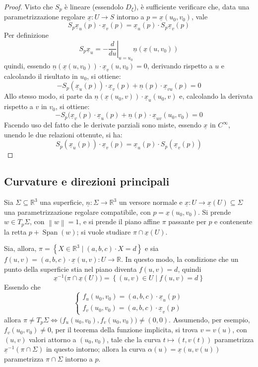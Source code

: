 \documentclass[12pt]{scrartcl}
\theoremstyle{style}
\newcommand*\Eval[3]{\left.#1\right\rvert_{#2}^{#3}}
\numberwithin{equation}{subsection}
\begin{document}
\begin{proof}
	Visto che $S_p$ \`e lineare (essendolo $D_\xi $), \`e sufficiente verificare che, data una parametrizzazione regolare $\underline{x}:U\to S$ intorno a $p=\underline{x}(u_0,v_0)$, vale
	\[
	S_p \underline{x}_u(p) \cdot \underline{x}_v (p) = \underline{x}_u(p) \cdot S_p \underline{x}_v(p)
	\] 
Per definizione
\[
	S_p \underline{x}_u = - \Eval{\frac{d }{d u} }{u = u_0}{}\underline{n}(\underline{x}(u,v_0))
\] 
quindi, essendo $\underline{n}(\underline{x}(u,v_0)) \cdot \underline{x}_v(u,v_0) = 0$, derivando rispetto a $u$ e calcolando il risultato in $u_0$, si ottiene:
\[
-S_p(\underline{x}_u(p)) \cdot \underline{x}_v (p) + \underline{n}(p) \cdot \underline{x}_{vu} (p) = 0
\] 
Allo stesso modo, si parte da $\underline{n}(\underline{x}(u_0,v)) \cdot \underline{x}_u(u_0,v)$ e, calcolando la derivata rispetto a $v$ in $v_0$, si ottiene:
\[
-S_p(\underline{x}_v(p) \cdot \underline{x}_u(p) + \underline{n}(p) \cdot \underline{x}_{uv} (u_0,v_0) = 0 
\] 
Facendo uso del fatto che le derivate parziali sono miste, essendo $\underline{x}$ in $C^\infty$, unendo le due relazioni ottenute, si ha: 
\[
S_p(\underline{x}_u(p)) \cdot \underline{x}_v(p) = \underline{x}_u(p) \cdot S_p(\underline{x}_v(p))
\] 
\end{proof}
\subsection{Curvature e direzioni principali}
Sia $\Sigma \subseteq \mathbb{R}^3$ una superficie, $\underline{n}:\Sigma \to \mathbb{R}^3$ un versore normale e $\underline{x}:U\to \underline{x}(U) \subseteq \Sigma$ una parametrizzazione regolare compatibile, con $p = \underline{x}(u_0,v_0)$.
Si prende $w \in T_p\Sigma$, con $\left\lVert w \right\rVert =1$, e si prende il piano affine $\pi$ passante per $p$ e contenente la retta $p + \operatorname{Span} (w)$; si vuole studiare $\pi \cap \underline{x}(U)$.

	Sia, allora, $\pi= \left\{ X \in \mathbb{R}^3  \mid (a,b,c) \cdot X = d \right\} $ e sia $f(u,v) = (a,b,c) \cdot \underline{x}(u,v) : U \to \mathbb{R}$.
	In questo modo, la condizione che un punto della superficie stia nel piano diventa $f(u,v) = d$, quindi
	\[
	\underline{x}^{-1}\big(\pi\cap \underline{x}(U)\big) = \left\{ (u,v) \in U  \mid f(u,v) = d \right\} 
	\] 
	Essendo che
	\[
	\begin{cases}
		f_u(u_0,v_0) = (a,b,c) \cdot \underline{x}_u(p)\\
		f_v(u_0,v_0) = (a,b,c) \cdot \underline{x}_v(p)
	\end{cases}
	\] 
	allora $\pi \neq T_p \Sigma\iff \big(f_u(u_0,v_0) , f_v(u_0,v_0)\big)\neq (0,0)$.
	Assumendo, per esempio, $f_v (u_0,v_0) \neq 0$, per il teorema della funzione implicita, si trova $v = v(u)$, con $(u,v)$ valori attorno a $(u_0,v_0)$, tale che la curva $t \longmapsto (t ,v(t))$ parametrizza $\underline{x}^{-1}(\pi\cap \Sigma)$ in questo intorno; allora la curva $\alpha (u) = \underline{x}(u,v(u))$ parametrizza $\pi \cap \Sigma$ intorno a $p$.
\end{document}
